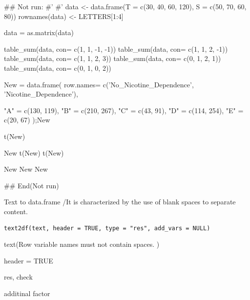 \documentclass[a4paper]{book}
\begin{document}
%
\begin{Examples}
\begin{ExampleCode}

## Not run: 
#'
#'
data <- data.frame(T = c(30, 40, 60, 120),
                   S = c(50, 70, 60, 80))
rownames(data) <- LETTERS[1:4]

data = as.matrix(data)


table_sum(data, con= c(1, 1, -1, -1))
table_sum(data, con= c(1, 1, 2, -1))
table_sum(data, con= c(1, 1, 2, 3))
table_sum(data, con= c(0, 1, 2, 1))
table_sum(data, con= c(0, 1, 0, 2))

New = data.frame(
  row.names= c('No_Nicotine_Dependence', 'Nicotine_Dependence'),

  "A" = c(130, 119),
  "B" = c(210, 267),
  "C" = c(43, 91),
  "D" = c(114, 254),
  "E" = c(20, 67)
);New

t(New)%

New %
t(New)
t(New)%

New%
New%
New%


## End(Not run)


\end{ExampleCode}
\end{Examples}
%
\begin{Description}
Text to data.frame /It is characterized by the use of blank spaces to separate content.
\end{Description}
%
\begin{Usage}
\begin{verbatim}
text2df(text, header = TRUE, type = "res", add_vars = NULL)
\end{verbatim}
\end{Usage}
%
\begin{Arguments}
\begin{ldescription}
\item[\code{text}] text(Row variable names must not contain spaces. )

\item[\code{header}] header = TRUE

\item[\code{type}] res, check

\item[\code{add\_vars}] additinal factor
\end{ldescription}
\end{Arguments}
\end{document}
